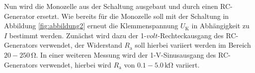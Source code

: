 Nun wird die Monozelle aus der Schaltung ausgebaut und durch einen RC-Generator ersetzt. Wie bereits für die Monozelle soll mit der Schaltung in Abbildung \ref{fig:abbildung2} erneut die Klemmenspannung $U_{\text{K}}$ in Abhängigkeit zu $I$ bestimmt werden. Zunächst wird dazu der 1-$\si{volt}$-Rechteckausgang des RC-Generators verwendet, der Widerstand $R_{\text{a}}$ soll hierbei variiert werden im Bereich $20-250 \, \si{\ohm}$.
In einer weiteren Messung wird der 1-V-Sinusausgang des RC-Generators verwendet, hierbei wird $R_{\text{a}}$ von $0.1-5.0 \, \si{\kilo\ohm}$ variiert.
